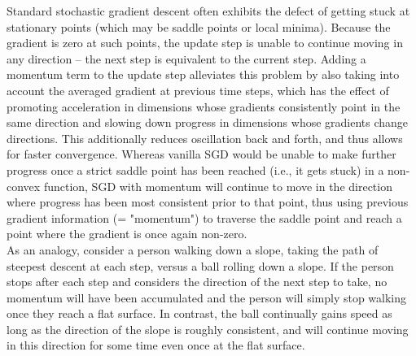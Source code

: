 \begin{exercise}
Standard stochastic gradient descent often exhibits the defect of getting stuck at stationary points (which may be saddle points or local minima). Because the gradient is zero at such points, the update step is unable to continue moving in any direction -- the next step is equivalent to the current step. Adding a momentum term to the update step alleviates this problem by also taking into account the averaged gradient at previous time steps, which has the effect of promoting acceleration in dimensions whose gradients consistently point in the same direction and slowing down progress in dimensions whose gradients change directions. This additionally reduces oscillation back and forth, and thus allows for faster convergence. Whereas vanilla SGD would be unable to make further progress once a strict saddle point has been reached (i.e., it gets stuck) in a non-convex function, SGD with momentum will continue to move in the direction where progress has been most consistent prior to that point, thus using previous gradient information (= "momentum") to traverse the saddle point and reach a point where the gradient is once again non-zero.\\

As an analogy, consider a person walking down a slope, taking the path of steepest descent at each step, versus a ball rolling down a slope. If the person stops after each step and considers the direction of the next step to take, no momentum will have been accumulated and the person will simply stop walking once they reach a flat surface. In contrast, the ball continually gains speed as long as the direction of the slope is roughly consistent, and will continue moving in this direction for some time even once at the flat surface. 

\end{exercise}


